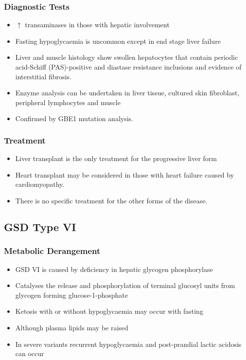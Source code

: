 \documentclass{scrartcl}
\begin{document}
\subsubsection{Diagnostic Tests}
\label{sec:org44cef21}

\begin{itemize}
\item \(\uparrow\) transaminases in those with hepatic involvement
\item Fasting hypoglycaemia is uncommon except in end stage liver failure
\item Liver and muscle histology show swollen hepatocytes that contain
periodic acid-Schiff (PAS)-positive and diastase resistance
inclusions and evidence of interstitial fibrosis.
\item Enzyme analysis can be undertaken in liver tissue, cultured skin
fibroblast, peripheral lymphocytes and muscle
\item Confirmed by GBE1 mutation analysis.
\end{itemize}

\subsubsection{Treatment}
\label{sec:org9946ac7}
\begin{itemize}
\item Liver transplant is the only treatment for the progressive liver form
\item Heart transplant may be considered in those with heart failure caused by cardiomyopathy.
\item There is no specific treatment for the other forms of the disease.
\end{itemize}
\subsection{GSD Type VI}
\label{sec:org96d6412}
\subsubsection{Metabolic Derangement}
\label{sec:org699b544}
\begin{itemize}
\item GSD VI is caused by deficiency in hepatic glycogen phosphorylase
\item Catalyses the release and phosphorylation of terminal glucosyl units
from glycogen forming glucose-1-phosphate
\item Ketosis with or without hypoglycaemia may occur with fasting
\item Although plasma lipids may be raised
\item In severe variants recurrent hypoglycaemia and post-prandial lactic
acidosis can occur
\end{itemize}
\end{document}
